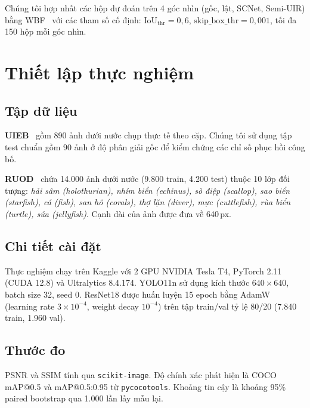 \documentclass[runningheads]{llncs}
\begin{document}
Chúng tôi hợp nhất các hộp dự đoán trên 4 góc nhìn (gốc, lật, SCNet, Semi-UIR) bằng WBF~\cite{solovyevWeightedBoxesFusion2021} với các tham số cố định: $\text{IoU}_{\mathrm{thr}} = 0{,}6$, $\text{skip\_box\_thr} = 0{,}001$, tối đa 150 hộp mỗi góc nhìn.

\section{Thiết lập thực nghiệm}
\label{sec:setup}

\subsection{Tập dữ liệu}

\textbf{UIEB}~\cite{liUnderwaterImageEnhancement2019} gồm 890 ảnh dưới nước chụp thực tế theo cặp. Chúng tôi sử dụng tập test chuẩn gồm 90 ảnh ở độ phân giải gốc để kiểm chứng các chỉ số phục hồi công bố.

\textbf{RUOD}~\cite{fuRethinkingGeneralUnderwater2023} chứa 14.000 ảnh dưới nước (9.800 train, 4.200 test) thuộc 10 lớp đối tượng: \emph{hải sâm (holothurian), nhím biển (echinus), sò điệp (scallop), sao biển (starfish), cá (fish), san hô (corals), thợ lặn (diver), mực (cuttlefish), rùa biển (turtle), sứa (jellyfish)}. Cạnh dài của ảnh được đưa về 640\,px.

\subsection{Chi tiết cài đặt}

Thực nghiệm chạy trên Kaggle với 2 GPU NVIDIA Tesla T4, PyTorch 2.11 (CUDA 12.8) và Ultralytics 8.4.174. YOLO11n sử dụng kích thước $640 \times 640$, batch size 32, seed 0. ResNet18 được huấn luyện 15 epoch bằng AdamW (learning rate $3 \times 10^{-4}$, weight decay $10^{-4}$) trên tập train/val tỷ lệ 80/20 (7.840 train, 1.960 val).

\subsection{Thước đo}

PSNR và SSIM tính qua \texttt{scikit-image}. Độ chính xác phát hiện là COCO mAP@0.5 và mAP@0.5:0.95 từ \texttt{pycocotools}. Khoảng tin cậy là khoảng 95\% paired bootstrap qua 1.000 lần lấy mẫu lại.

\end{document}

